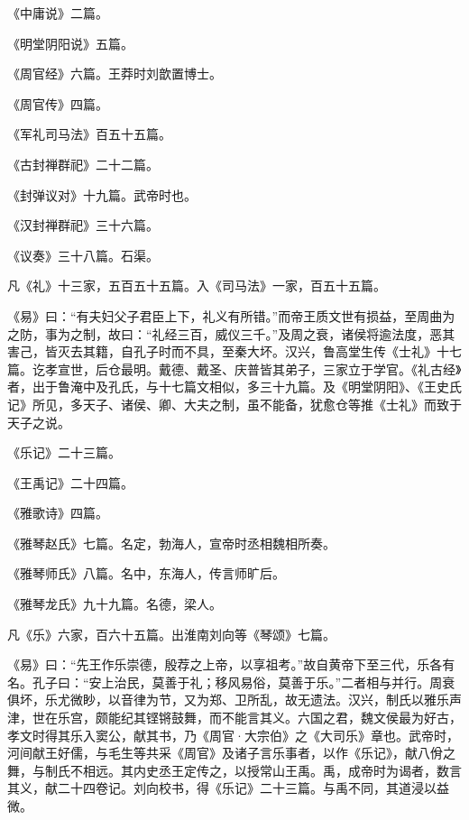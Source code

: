 \documentclass[12pt,UTF8]{ctexbook}
\begin{document}
《中庸说》二篇。



《明堂阴阳说》五篇。



《周官经》六篇。王莽时刘歆置博士。



《周官传》四篇。



《军礼司马法》百五十五篇。



《古封禅群祀》二十二篇。



《封弹议对》十九篇。武帝时也。



《汉封禅群祀》三十六篇。



《议奏》三十八篇。石渠。



凡《礼》十三家，五百五十五篇。入《司马法》一家，百五十五篇。



《易》曰：“有夫妇父子君臣上下，礼义有所错。”而帝王质文世有损益，至周曲为之防，事为之制，故曰：“礼经三百，威仪三千。”及周之衰，诸侯将逾法度，恶其害己，皆灭去其籍，自孔子时而不具，至秦大坏。汉兴，鲁高堂生传《士礼》十七篇。讫孝宣世，后仓最明。戴德、戴圣、庆普皆其弟子，三家立于学官。《礼古经》者，出于鲁淹中及孔氏，与十七篇文相似，多三十九篇。及《明堂阴阳》、《王史氏记》所见，多天子、诸侯、卿、大夫之制，虽不能备，犹愈仓等推《士礼》而致于天子之说。



《乐记》二十三篇。



《王禹记》二十四篇。



《雅歌诗》四篇。



《雅琴赵氏》七篇。名定，勃海人，宣帝时丞相魏相所奏。



《雅琴师氏》八篇。名中，东海人，传言师旷后。



《雅琴龙氏》九十九篇。名德，梁人。



凡《乐》六家，百六十五篇。出淮南刘向等《琴颂》七篇。



《易》曰：“先王作乐崇德，殷荐之上帝，以享祖考。”故自黄帝下至三代，乐各有名。孔子曰：“安上治民，莫善于礼；移风易俗，莫善于乐。”二者相与并行。周衰俱坏，乐尤微眇，以音律为节，又为郑、卫所乱，故无遗法。汉兴，制氏以雅乐声津，世在乐宫，颇能纪其铿锵鼓舞，而不能言其义。六国之君，魏文侯最为好古，孝文时得其乐入窦公，献其书，乃《周官·大宗伯》之《大司乐》章也。武帝时，河间献王好儒，与毛生等共采《周官》及诸子言乐事者，以作《乐记》，献八佾之舞，与制氏不相远。其内史丞王定传之，以授常山王禹。禹，成帝时为谒者，数言其义，献二十四卷记。刘向校书，得《乐记》二十三篇。与禹不同，其道浸以益微。
\end{document}
